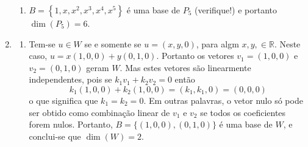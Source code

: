 \documentclass[12pt,a4paper]{article}
\newcommand*\R{\mathbb{R}}
\begin{document}
\begin{enumerate}
\begin{enumerate}
\item $B = \left\{1,x,x^2,x^3,x^4,x^5 \right\}$ é uma base de $P_5$ (verifique!) e portanto $\dim( P_5 ) = 6$.
\end{enumerate}

\item
\begin{enumerate}
\item Tem-se $u \in W$ se e somente se $u = (x,y,0)$, para algm $x,y, \in \R$. Neste caso, $u = x(1,0,0) + y(0,1,0)$. Portanto os vetores $v_1 = (1,0,0)$ e $v_2 = (0,1,0)$ geram $W$. Mas estes vetores são linearmente independentes, pois se $k_1 v_1 + k_2 v_2 = 0$ então
\[
k_1(1,0,0) + k_2(1,0,0) = (k_1,k_1,0) = (0,0,0)
\]
o que significa que $k_1 = k_2 = 0$. Em outras palavras, o vetor nulo só pode ser obtido como combinação linear de $v_1$ e $v_2$ se todos os coeficientes forem nulos. Portanto, $B = \{(1,0,0),(0,1,0)\}$ é uma base de $W$, e conclui-se que $\dim(W)=2$.


\end{enumerate}
\end{enumerate}
\end{document}
